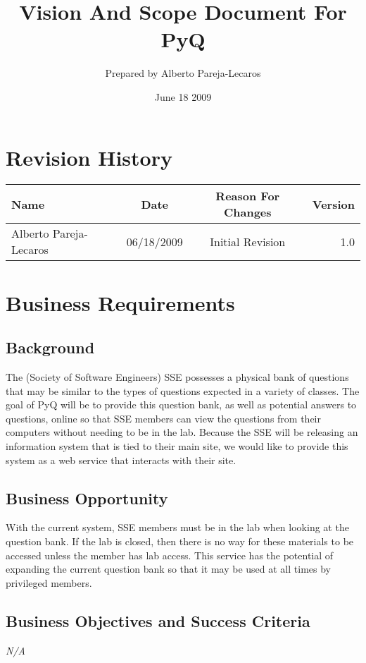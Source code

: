 \documentclass{report}
\title{Vision And Scope Document For PyQ}
\author{Prepared by Alberto Pareja-Lecaros}
\date{June 18 2009}
\begin{document}
  \maketitle
  \pagebreak
  \renewcommand{\thesection}{\arabic{section}}
  \renewcommand{\contentsname}{Table of Contents}
  \tableofcontents 
    \setcounter{tocdepth}{1}
    \section*{Revision History}    \begin{center}
      \begin{tabular}{ | l || c || c || r | }
      \hline
      \textbf{Name} & \textbf{Date} & \textbf{Reason For Changes} & \textbf{Version} \\ 
      \hline \hline
      Alberto Pareja-Lecaros & 06/18/2009 & Initial Revision & 1.0 \\ \hline
      \hline
      \end{tabular}
    \end{center}
  \section{Business Requirements}
    \subsection{Background}
The (Society of Software Engineers) SSE  possesses a physical bank of questions that may be similar to the types of questions expected in a variety of classes. The goal of PyQ will be to provide this question bank, as well as potential answers to questions, online so that SSE members can view the questions from their computers without needing to be in the lab. Because the SSE will be releasing an information system that is tied to their main site, we would like to provide this system as a web service that interacts with their site.
    \subsection{Business Opportunity}
With the current system, SSE members must be in the lab when looking at the question bank. If the lab is closed, then there is no way for these materials to be accessed unless the member has lab access. This service has the potential of expanding the current question bank so that it may be used at all times by privileged members.
    \subsection{Business Objectives and Success Criteria}      \textit{N/A}
\end{document}
